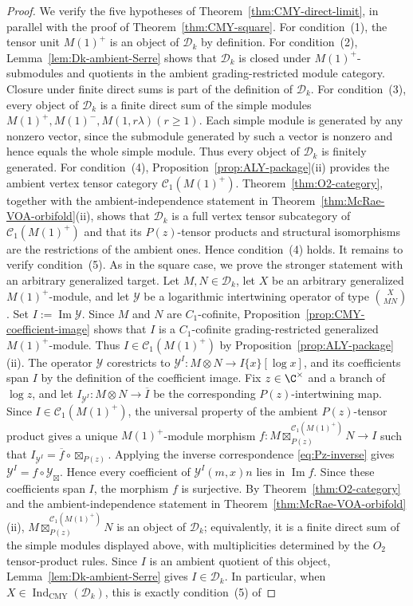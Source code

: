 \documentclass[12pt,leqno]{amsart}
\numberwithin{equation}{section} \newtheorem{thm}{Theorem}[section] \newtheorem{lem}[thm]{Lemma} \newtheorem{ex}[thm]{Example} \newtheorem{prop}[thm]{Proposition} \newtheorem{cor}[thm]{Corollary} \newtheorem{defi}[thm]{Definition} \newtheorem{rmk}[thm]{Remark} \newtheorem{notation}[thm]{Notation}
\newcommand{\Dk}{\mathcal D_k}
\newcommand{\IndCMY}{\operatorname{Ind}_{\mathrm{CMY}}}
\begin{document}
\begin{proof}
We verify the five hypotheses of Theorem~\ref{thm:CMY-direct-limit}, in parallel with the proof of Theorem~\ref{thm:CMY-square}. For condition~\textnormal{(1)}, the tensor unit $M(1)^+$ is an object of $\Dk$ by definition. For condition~\textnormal{(2)}, Lemma~\ref{lem:Dk-ambient-Serre} shows that $\Dk$ is closed under $M(1)^+$-submodules and quotients in the ambient grading-restricted module category. Closure under finite direct sums is part of the definition of $\Dk$. For condition~\textnormal{(3)}, every object of $\Dk$ is a finite direct sum of the simple modules \(M(1)^+, M(1)^-, M(1,r\lambda)(r\ge1).\) Each simple module is generated by any nonzero vector, since the submodule generated by such a vector is nonzero and hence equals the whole simple module. Thus every object of $\Dk$ is finitely generated. For condition~\textnormal{(4)}, Proposition~\ref{prop:ALY-package}(ii) provides the ambient vertex tensor category $\mathcal C_1(M(1)^+)$. Theorem~\ref{thm:O2-category}, together with the ambient-independence statement in Theorem~\ref{thm:McRae-VOA-orbifold}(ii), shows that $\Dk$ is a full vertex tensor subcategory of $\mathcal C_1(M(1)^+)$ and that its $P(z)$-tensor products and structural isomorphisms are the restrictions of the ambient ones. Hence condition~\textnormal{(4)} holds. It remains to verify condition~\textnormal{(5)}. As in the square case, we prove the stronger statement with an arbitrary generalized target. Let $M,N\in\Dk$, let $X$ be an arbitrary generalized $M(1)^+$-module, and let $\mathcal Y$ be a logarithmic intertwining operator of type \(\binom{X}{M N}\). Set $I:=\operatorname{Im}\mathcal Y$. Since $M$ and $N$ are $C_1$-cofinite, Proposition~\ref{prop:CMY-coefficient-image} shows that $I$ is a $C_1$-cofinite grading-restricted generalized $M(1)^+$-module. Thus \(I\in\mathcal C_1(M(1)^+)\) by Proposition~\ref{prop:ALY-package}(ii). The operator $\mathcal Y$ corestricts to \(\mathcal Y^I:M\otimes N\longrightarrow I\{x\}[\log x]\), and its coefficients span $I$ by the definition of the coefficient image. Fix $z\in\C^\times$ and a branch of $\log z$, and let \(I_{\mathcal Y^I}:M\otimes N\longrightarrow\overline I\) be the corresponding $P(z)$-intertwining map. Since $I\in\mathcal C_1(M(1)^+)$, the universal property of the ambient $P(z)$-tensor product gives a unique $M(1)^+$-module morphism \(f:M\boxtimes^{\mathcal C_1(M(1)^+)}_{P(z)}N\longrightarrow I\) such that \(I_{\mathcal Y^I}=\overline f\circ\boxtimes_{P(z)}\). Applying the inverse correspondence \eqref{eq:Pz-inverse} gives $\mathcal Y^I=f\circ\mathcal Y_{\boxtimes}$. Hence every coefficient of $\mathcal Y^I(m,x)n$ lies in $\operatorname{Im}f$. Since these coefficients span $I$, the morphism $f$ is surjective. By Theorem~\ref{thm:O2-category} and the ambient-independence statement in Theorem~\ref{thm:McRae-VOA-orbifold}(ii), \(M\boxtimes^{\mathcal C_1(M(1)^+)}_{P(z)}N\) is an object of $\Dk$; equivalently, it is a finite direct sum of the simple modules displayed above, with multiplicities determined by the $O_2$ tensor-product rules. Since $I$ is an ambient quotient of this object, Lemma~\ref{lem:Dk-ambient-Serre} gives $I\in\Dk$. In particular, when $X\in\IndCMY(\Dk)$, this is exactly condition~\textnormal{(5)} of 
\end{proof}
\end{document}
